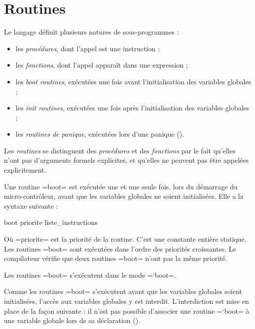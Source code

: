 




\chapter{Routines}

Le langage définit plusieurs natures de sous-programmes :
\begin{itemize}
  \item les \emph{procédures}, dont l'appel est une instruction ;
  \item les \emph{fonctions}, dont l'appel apparaît dans une expression ;
  \item les \emph{boot routines}, exécutées une fois avant l'initialisation des variables globales ;
  \item les \emph{init routines}, exécutées une fois après l'initialisation des variables globales ;
  \item les \emph{routines de panique}, exécutées lors d'une panique ().
\end{itemize}

Les \emph{routines} se distinguent des \emph{procédures} et des \emph{fonctions} par le fait qu'elles n'ont pas d'arguments formels explicites, et qu'elles ne peuvent pas être appelées explicitement.










Une routine \plm=boot= est exécutée une et une seule fois, lors du démarrage du micro-contrôleur, avant que les variables globales ne soient initialisées. Elle a la syntaxe suivante :
\begin{PLM}
boot priorite {
  liste_instructions
}
\end{PLM}
Où \plm=priorite= est la priorité de la routine. C'est une constante entière statique. Les routines \plm=boot= sont exécutées dans l'ordre des priorités croissantes. Le compilateur vérifie que deux routines \plm=boot= n'ont pas la même priorité.

Les routines \plm=boot= s'exécutent dans le mode \plm=`boot=.

Comme les routines \plm=boot= s'exécutent avant que les variables globales soient initialisées, l'accès aux variables globales y est interdit. L'interdiction est mise en place de la façon suivante : il n'est pas possible d'associer une routine \plm=`boot= à une variable globale lors de sa déclaration ().

